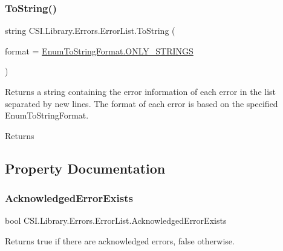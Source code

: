 \subsubsection{\texorpdfstring{ToString()}{ToString()}}
{\footnotesize\ttfamily string C\+S\+I.\+Library.\+Errors.\+Error\+List.\+To\+String (\begin{DoxyParamCaption}\item[{\mbox{\hyperlink{class_c_s_i_1_1_library_1_1_errors_1_1_error_list_aa208d07fb97d8c5eaa0910fde0c7921e}{Enum\+To\+String\+Format}}}]{format = {\ttfamily \mbox{\hyperlink{class_c_s_i_1_1_library_1_1_errors_1_1_error_list_aa208d07fb97d8c5eaa0910fde0c7921ead28d2b7c61d16fdb9ede7dc09e9cf481}{Enum\+To\+String\+Format.\+O\+N\+L\+Y\+\_\+\+S\+T\+R\+I\+N\+GS}}} }\end{DoxyParamCaption})\hspace{0.3cm}{\ttfamily [inline]}}



Returns a string containing the error information of each error in the list separated by new lines. The format of each error is based on the specified Enum\+To\+String\+Format. 

\begin{DoxyReturn}{Returns}

\end{DoxyReturn}


\subsection{Property Documentation}
\mbox{\label{class_c_s_i_1_1_library_1_1_errors_1_1_error_list_a7e4181e9242e866cccf99596b98cd425}} 
\subsubsection{\texorpdfstring{AcknowledgedErrorExists}{AcknowledgedErrorExists}}
{\footnotesize\ttfamily bool C\+S\+I.\+Library.\+Errors.\+Error\+List.\+Acknowledged\+Error\+Exists\hspace{0.3cm}{\ttfamily [get]}}



Returns true if there are acknowledged errors, false otherwise. 

